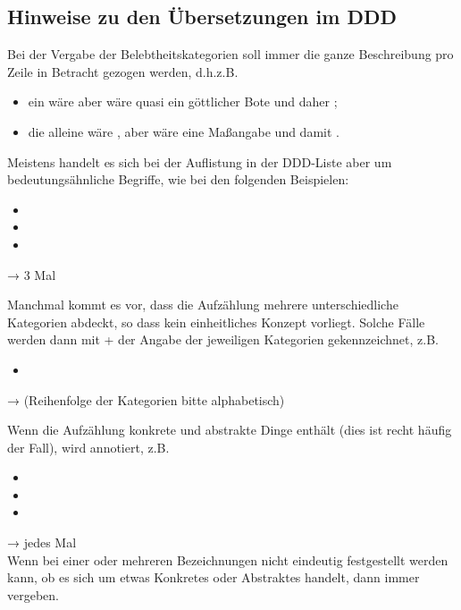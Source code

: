 {\subsection{Hinweise zu den Übersetzungen im DDD}

Bei der Vergabe der Belebtheitskategorien soll immer die ganze Beschreibung pro Zeile in Betracht gezogen werden, d.h.\thinspace{}z.B. 

\begin{itemize}
\item ein  wäre  aber  wäre quasi ein göttlicher Bote und daher ; 
\item die  alleine wäre , aber  wäre eine Maßangabe und damit .
\end{itemize}

Meistens handelt es sich bei der Auflistung in der DDD-Liste aber um bedeutungsähnliche Begriffe, wie bei den folgenden Beispielen:

\begin{itemize}
  \itemsep0pt
\item {}
\item {}
\item {} 
\end{itemize}

→ 3 Mal 

Manchmal kommt es vor, dass die Aufzählung mehrere unterschiedliche Kategorien abdeckt, so dass kein einheitliches Konzept vorliegt. Solche Fälle werden dann mit   + der Angabe der jeweiligen Kategorien gekennzeichnet, z.B.

\begin{itemize}
\item {}
\end{itemize} 

→  (Reihenfolge der Kategorien bitte alphabetisch)

\noindent 
{} Wenn die Aufzählung konkrete und abstrakte Dinge enthält (dies ist recht häufig der Fall), wird  annotiert, z.B. 

\begin{itemize}
  \itemsep0pt
\item {}
\item {}
\item {}
\end{itemize}
→ jedes Mal  
\\
 Wenn bei einer oder mehreren Bezeichnungen nicht eindeutig festgestellt werden kann, ob es sich um etwas Konkretes oder Abstraktes handelt, dann immer  vergeben. 

}
